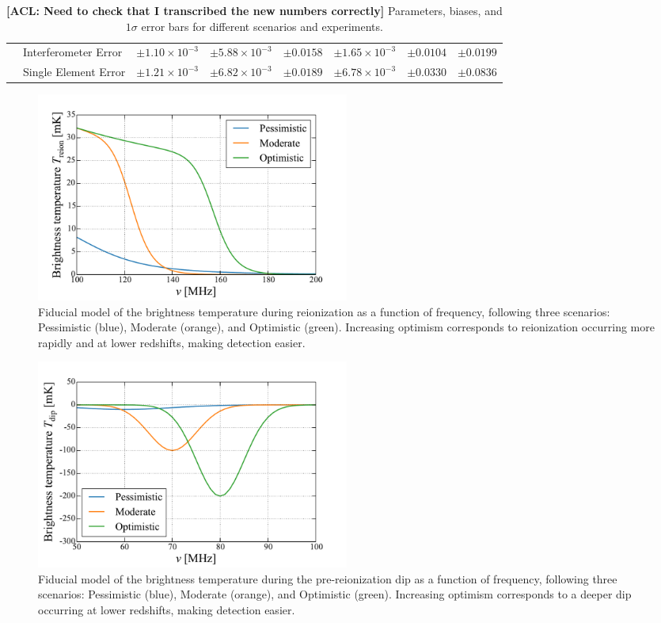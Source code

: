 \documentclass[twocolumn,apj,numberedappendix]{emulateapj}
\newcommand{\acl}[1]{{\color{red} \textbf{[ACL:  #1]}}}
\begin{document}
\begin{table}[htbp]
\begin{tabular}{@{} llcccccc @{}}
      			 & Interferometer Error & $\pm 1.10 \times 10^{-3}$ & $\pm 5.88 \times 10^{-3}$ & $\pm 0.0158$ & $\pm 1.65\times 10^{-3}$ & $\pm 0.0104$ & $\pm 0.0199$ \\
      			 & Single Element Error  & $\pm 1.21 \times 10^{-3}$ & $\pm 6.82 \times 10^{-3}$ & $\pm 0.0189$ & $\pm 6.78\times 10^{-3}$ & $\pm 0.0330$ & $\pm 0.0836$ \\
      \bottomrule
   \end{tabular}
   \caption{\acl{Need to check that I transcribed the new numbers correctly} Parameters, biases, and $1\sigma$ error bars for different scenarios and experiments.}
   \label{tab:params}
\end{table}

\begin{figure}[h]
	\centering
	\includegraphics[width=0.5\textwidth]{figures/reionScenarios.pdf}
	\caption{Fiducial model of the brightness temperature during reionization as a function of frequency, following three scenarios: Pessimistic (blue), Moderate (orange), and Optimistic (green). Increasing optimism corresponds to reionization occurring more rapidly and at lower redshifts, making detection easier.}
	\label{fig:reionScenarios}
\end{figure}


\begin{figure}[h]
	\centering
	\includegraphics[width=0.5\textwidth]{figures/dipScenarios.pdf}
	\caption{Fiducial model of the brightness temperature during the pre-reionization dip as a function of frequency, following three scenarios: Pessimistic (blue), Moderate (orange), and Optimistic (green). Increasing optimism corresponds to a deeper dip occurring at lower redshifts, making detection easier.}
	\label{fig:dipScenarios}
\end{figure}
\end{document}
